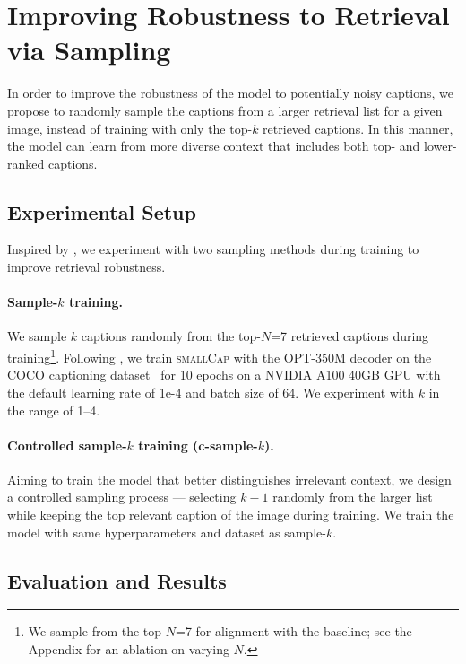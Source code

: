 \section{Improving Robustness to Retrieval via Sampling}
\label{sec:sample}


In order to improve the robustness of the model to potentially noisy captions, we propose to randomly sample the captions from a larger retrieval list for a given image, instead of training with only the top-$k$ retrieved captions. In this manner, the model can learn from more diverse context that includes both top- and lower-ranked captions.

\subsection{Experimental Setup}
\label{subsec:exp}
Inspired by \citet{hoang2022improving}, we experiment with two sampling methods during training to improve retrieval robustness.



\paragraph*{Sample-$k$ training.}
\label{para:training}
We sample $k$ captions randomly from the top-$N$=7 retrieved captions during training\footnote{We sample from the top-$N$=7 for alignment with the baseline; see the Appendix for an ablation on varying $N$.}. Following \citet{ramos2023smallcap}, we train \textsc{smallCap} with the OPT-350M decoder on the COCO captioning dataset~\citep{chen2015microsoft} for 10 epochs on a NVIDIA A100 40GB GPU with the default learning rate of 1e-4 and batch size of 64. We experiment with $k$ in the range of 1--4.



\paragraph*{Controlled sample-$k$ training (c-sample-$k$).}
Aiming to train the model that better distinguishes irrelevant context, we design a controlled sampling process --- selecting $k-1$ randomly from the larger list while keeping the top relevant caption of the image during training. We train the model with same hyperparameters and dataset as sample-$k$.


\subsection{Evaluation and Results}
\label{subsec:results}

